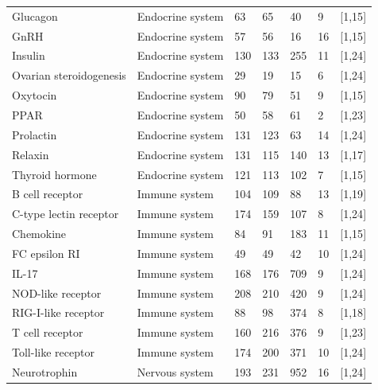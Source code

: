 \begin{table}[H]
\begin{adjustbox}{center}
\begin{tabular}{|l|l|l|l|l|l|l|}
Glucagon                & Endocrine system            & 63   & 65  & 40    & 9  & {[}1,15{]}  \\   
GnRH                    & Endocrine system            & 57   & 56  & 16    & 16 & {[}1,15{]}  \\  
Insulin                 & Endocrine system            & 130  & 133 & 255   & 11 & {[}1,24{]}  \\  
Ovarian steroidogenesis & Endocrine system            & 29   & 19  & 15    & 6  & {[}1,24{]}  \\   
Oxytocin                & Endocrine system            & 90   & 79  & 51    & 9  & {[}1,15{]}  \\    
PPAR                    & Endocrine system            & 50   & 58  & 61    & 2  & {[}1,23{]}  \\       
Prolactin               & Endocrine system            & 131  & 123 & 63    & 14 & {[}1,24{]}  \\   
Relaxin                 & Endocrine system            & 131  & 115 & 140   & 13 & {[}1,17{]}  \\   
Thyroid hormone         & Endocrine system            & 121  & 113 & 102   & 7  & {[}1,15{]}  \\\hline   
B cell receptor         & Immune system               & 104  & 109 & 88    & 13 & {[}1,19{]}  \\ 
C-type lectin receptor  & Immune system               & 174  & 159 & 107   & 8  & {[}1,24{]}  \\     
Chemokine               & Immune system               & 84   & 91  & 183   & 11 & {[}1,15{]}  \\     
FC epsilon RI           & Immune system               & 49   & 49  & 42    & 10 & {[}1,24{]}  \\    
IL-17                   & Immune system               & 168  & 176 & 709   & 9  & {[}1,24{]}  \\  
NOD-like receptor       & Immune system               & 208  & 210 & 420   & 9  & {[}1,24{]}  \\    
RIG-I-like receptor     & Immune system               & 88   & 98  & 374   & 8  & {[}1,18{]}  \\    
T cell receptor         & Immune system               & 160  & 216 & 376   & 9  & {[}1,23{]}  \\  
Toll-like receptor      & Immune system               & 174  & 200 & 371   & 10 & {[}1,24{]}  \\\hline  
Neurotrophin            & Nervous system              & 193  & 231 & 952   & 16 & {[}1,24{]}  \\\hline  

\end{tabular}
\end{adjustbox}
\end{table}
